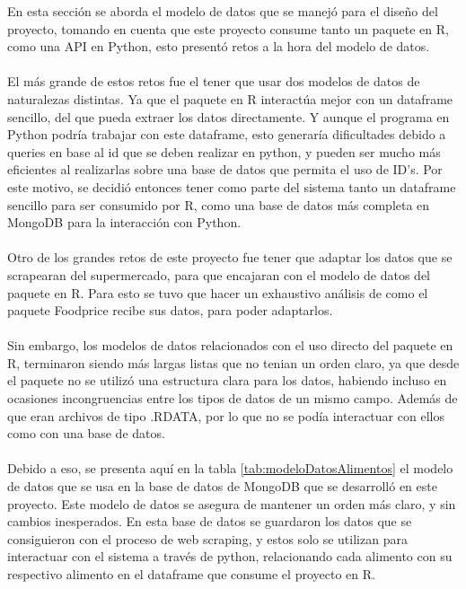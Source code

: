 \noindent En esta secci\'on se aborda el modelo de datos que se manej\'o para el dise\~no del proyecto, tomando en cuenta que este proyecto consume tanto un paquete en R, como una API en Python, esto present\'o retos a la hora del modelo de datos.
\\
\\
El m\'as grande de estos retos fue el tener que usar dos modelos de datos de naturalezas distintas. Ya que el paquete en R interact\'ua mejor con un dataframe sencillo, del que pueda extraer los datos directamente. Y aunque el programa en  Python  podr\'ia trabajar con este dataframe, esto generar\'ia dificultades debido a queries en base al id que se deben realizar en python, y pueden ser mucho m\'as eficientes al realizarlas sobre una base de datos que permita el uso de ID's. Por este motivo, se decidi\'o entonces tener como parte del sistema tanto un dataframe sencillo para ser consumido por R, como una base de datos m\'as completa en MongoDB para la interacci\'on con Python.
\\
\\
Otro de los grandes retos de este proyecto fue tener que adaptar los datos que se scrapearan del supermercado, para que encajaran con el modelo de datos del paquete en R. Para esto se tuvo que hacer un exhaustivo an\'alisis de como el paquete Foodprice recibe sus datos, para poder adaptarlos.
\\
\\
Sin embargo, los modelos de datos relacionados con el uso directo del paquete en R, terminaron siendo m\'as largas listas que no tenian un orden claro, ya que desde el paquete no se utiliz\'o una estructura clara para los datos, habiendo incluso en ocasiones incongruencias entre los tipos de datos de un mismo campo. Adem\'as de que eran archivos de tipo .RDATA, por lo que no se pod\'ia interactuar con ellos como con una base de datos.
\\
\\
Debido a eso, se presenta aqu\'i en la tabla \ref{tab:modeloDatosAlimentos} el modelo de datos que se usa en la base de datos de MongoDB que se desarroll\'o en este proyecto. Este modelo de datos se asegura de mantener un orden m\'as claro, y sin cambios inesperados. En esta base de datos se guardaron los datos que se consiguieron con el proceso de web scraping, y estos solo se utilizan para interactuar con el sistema a trav\'es de python, relacionando cada alimento con su respectivo alimento en el dataframe que consume el proyecto en R.


